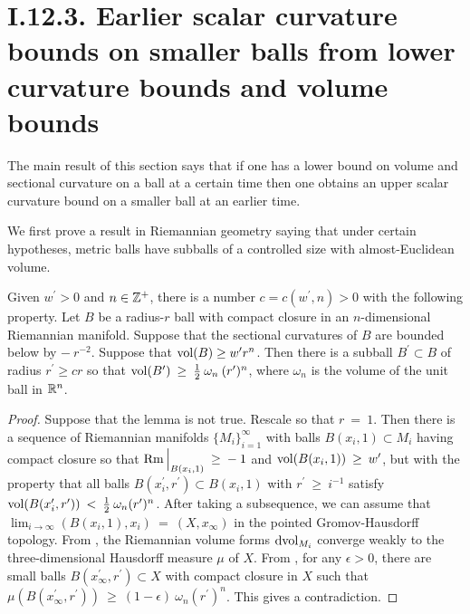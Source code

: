\section{I.12.3. Earlier scalar curvature bounds on smaller balls from
lower curvature bounds and volume bounds}
\label{I.12.3}

The main result of this section
says that if one has a lower bound on volume and sectional curvature
on a ball at a certain time then one obtains an upper scalar curvature bound on
a smaller ball at an earlier time.

We first prove a result in Riemannian geometry saying that under
certain hypotheses, metric balls have subballs of a controlled size
with almost-Euclidean volume.

\begin{lemma}
  \label{lem:kl-earlier-scalar-curvature-bounds-smaller-balls-from-lower-curvature-bound-existence-scalar-curvature}
 \label{Alexlemma}
Given $w^\prime > 0$ and $n \in {\mathbb Z}^+$, there is a number $c = c(w^\prime,n) > 0$ with the
following property.
Let $B$ be a radius-$r$ ball with compact closure in an $n$-dimensional Riemannian
manifold. Suppose that the sectional curvatures of $B$ are bounded below by
$- \: r^{-2}$.
Suppose that $\operatorname{vol}(B) \ge w^\prime r^n$. Then there is a subball $B^\prime \subset B$ of
radius $r^\prime \ge cr$ so that $\operatorname{vol}(B^\prime) \: \ge \: \frac12 \: \omega_n \:
(r^\prime)^n$, where $\omega_n$ is the volume of the unit ball in ${\mathbb R}^n$.
\end{lemma}
\begin{proof}
Suppose that the lemma is not true. Rescale
so that $r \: = \: 1$. Then there is a sequence of Riemannian
manifolds $\{M_i\}_{i=1}^\infty$ with balls $B(x_i, 1) \subset M_i$
having compact closure
so that $\operatorname{Rm} \Big|_{B(x_i, 1)} \: \ge \: - \: 1$ and
$\operatorname{vol}(B(x_i, 1)) \: \ge \: w^\prime$, but with the property that all balls
$B(x_i^\prime, r^\prime) \subset B(x_i, 1)$ with $r^\prime \: \ge \:
i^{-1}$ satisfy
$\operatorname{vol}(B(x_i^\prime, r^\prime)) \: < \: \frac{1}{2} \: \omega_n
(r^\prime)^n$. After taking a subsequence, we can assume that
$\lim_{i \rightarrow \infty} (B(x_i, 1), x_i) \: = \: (X, x_\infty)$ in the
pointed Gromov-Hausdorff topology. From
\cite[Theorem 10.8]{Burago-Gromov-Perelman}, the Riemannian volume
forms $\operatorname{dvol}_{M_i}$ converge weakly to the three-dimensional Hausdorff
measure $\mu$ of $X$. From \cite[Corollary 6.7 and
Section 9]{Burago-Gromov-Perelman}, for any $\epsilon > 0$,
there are small balls $B(x_\infty^\prime,
r^\prime) \subset X$ with compact closure in $X$ such that $\mu(B(x_\infty^\prime,
r^\prime)) \: \ge \: (1-\epsilon) \: \omega_n (r^\prime)^n$.
This gives a contradiction.
\end{proof}

